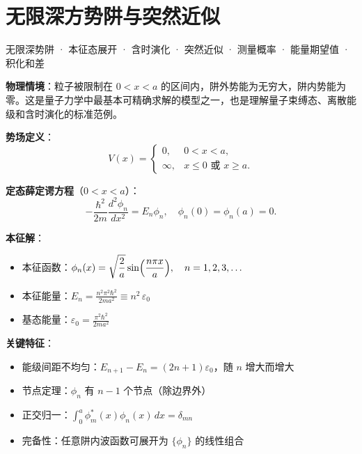 
\section{无限深方势阱与突然近似}
\label{sec:infinite-square-well}

\begin{tipbox}[关键词标签]
无限深势阱 · 本征态展开 · 含时演化 · 突然近似 · 测量概率 · 能量期望值 · 积化和差
\end{tipbox}

\begin{modelbox}[模型：一维无限深方势阱]
\textbf{物理情境}：粒子被限制在 $0<x<a$ 的区间内，阱外势能为无穷大，阱内势能为零。这是量子力学中最基本可精确求解的模型之一，也是理解量子束缚态、离散能级和含时演化的标准范例。

\textbf{势场定义}：
\[
V(x)=\begin{cases}0,&0<x<a,\\\infty,&x\leq0\text{ 或 }x\geq a.\end{cases}
\]

\textbf{定态薛定谔方程}（$0<x<a$）：
\[
-\frac{\hbar^2}{2m}\frac{d^2\phi_n}{dx^2}=E_n\phi_n,\quad\phi_n(0)=\phi_n(a)=0.
\]

\textbf{本征解}：
\begin{itemize}[nosep]
    \item 本征函数：$\displaystyle\phi_n(x)=\sqrt{\frac{2}{a}}\sin\Bigl(\frac{n\pi x}{a}\Bigr),\quad n=1,2,3,\ldots$
    \item 本征能量：$\displaystyle E_n=\frac{n^2\pi^2\hbar^2}{2ma^2}\equiv n^2\,\varepsilon_0$
    \item 基态能量：$\varepsilon_0=\frac{\pi^2\hbar^2}{2ma^2}$
\end{itemize}

\textbf{关键特征}：
\begin{itemize}[nosep]
    \item 能级间距不均匀：$E_{n+1}-E_n=(2n+1)\varepsilon_0$，随 $n$ 增大而增大
    \item 节点定理：$\phi_n$ 有 $n-1$ 个节点（除边界外）
    \item 正交归一：$\int_0^a\phi_m^*(x)\phi_n(x)\,dx=\delta_{mn}$
    \item 完备性：任意阱内波函数可展开为 $\{\phi_n\}$ 的线性组合
\end{itemize}
\end{modelbox}

